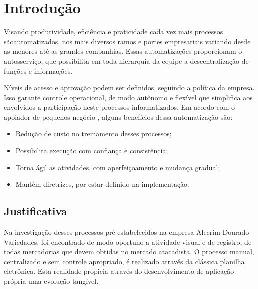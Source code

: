 \documentclass[
	draft,
	12pt,
	openright,
	oneside, %
	a4paper,
	chapter=TITLE,
	section=TITLE,
	english,
	brazil %
	]{abntex2-udesc}
\begin{document}


\tableofcontents*
\cleardoublepage

\textual
\pagestyle{simple}

\chapter{Introdução}

Visando produtividade, eficiência e praticidade cada vez mais processos sãoautomatizados, nos mais diversos ramos e portes empresariais variando desde as menores até as grandes companhias. Essas automatizações proporcionam o autosserviço, que possibilita em toda hierarquia da equipe a descentralização de funções e informações.

Níveis de acesso e aprovação podem ser definidos, seguindo a política da empresa. Isso garante controle operacional, de modo autônomo e flexível que simplifica aos envolvidos a participação neste processos informatizados. Em acordo com o apoiador de pequenos negócio , alguns benefícios dessa automatização são:

\begin{itemize}
\item Redução de custo no treinamento desses processos;
\item Possibilita execução com confiança e consistência;
\item Torna ágil as atividades, com aperfeiçoamento e mudança gradual;
\item Mantêm diretrizes, por estar definido na implementação.
\end{itemize}

\section{Justificativa}

Na investigação desses processos pré-estabelecidos na empresa Alecrim Dourado Variedades, foi encontrado de modo oportuno a atividade visual e de registro, de todas mercadorias que devem obtidas no mercado atacadista. O processo manual, centralizado e sem controle apropriado, é realizado através da clássica planilha eletrônica. Esta realidade propicia através do desenvolvimento de aplicação própria uma evolução tangível.
\end{document}
